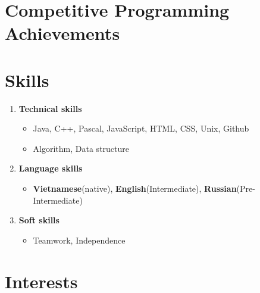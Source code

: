 \documentclass[12pt,a4paper,sans]{moderncv}        %
\begin{document}
\section{Competitive Programming Achievements}

\section{Skills}
\begin{enumerate}
    \item \textbf{Technical skills}
    \begin{itemize}
        \item Java, C++, Pascal, JavaScript, HTML, CSS, Unix, Github 
        \item Algorithm, Data structure
    \end{itemize}
    \item \textbf{Language skills}
    \begin{itemize}
        \item \textbf{Vietnamese}(native), \textbf{English}(Intermediate), \textbf{Russian}(Pre-Intermediate) 
    \end{itemize}
    \item \textbf{Soft skills}
    \begin{itemize}
        \item Teamwork, Independence
    \end{itemize}
\end{enumerate}

\section{Interests}





\clearpage
\end{document}
